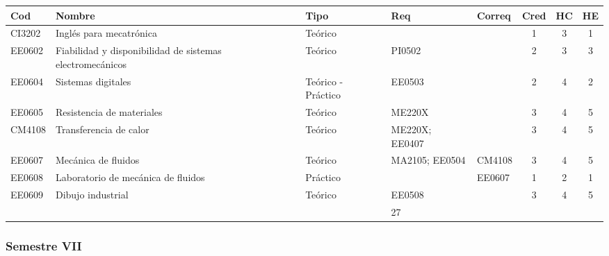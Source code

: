 \begin{center}
\small
\begin{adjustbox}{max width=\textwidth}
\begin{tabular}{|>{\RaggedRight\arraybackslash}p{1.25cm}|>{\RaggedRight\arraybackslash}p{5.2cm}|>{\RaggedRight\arraybackslash}p{1.65cm}|p{1.25cm}|p{1.25cm}|c|c|c|}
\hline
\rowcolor{grisEncabezado}
Cod & Nombre & Tipo & Req & Correq & Cred & HC & HE \\ \hline
CI3202 & Inglés para mecatrónica & Teórico &  &  & 1 & 3 & 1 \\ \hline
\rowcolor{azulTabla}
EE0602 & Fiabilidad y disponibilidad de sistemas electromecánicos & Teórico & PI0502 &  & 2 & 3 & 3 \\ \hline
EE0604 & Sistemas digitales & Teórico - Práctico & EE0503 &  & 2 & 4 & 2 \\ \hline
\rowcolor{azulTabla}
EE0605 & Resistencia de materiales & Teórico & ME220X &  & 3 & 4 & 5 \\ \hline
CM4108 & Transferencia de calor & Teórico & ME220X; EE0407 &  & 3 & 4 & 5 \\ \hline
\rowcolor{azulTabla}
EE0607 & Mecánica de fluidos & Teórico & MA2105; EE0504 & CM4108 & 3 & 4 & 5 \\ \hline
EE0608 & Laboratorio de mecánica de fluidos & Práctico &  & EE0607 & 1 & 2 & 1 \\ \hline
\rowcolor{azulTabla}
EE0609 & Dibujo industrial & Teórico & EE0508 &  & 3 & 4 & 5 \\ \hline
\multicolumn{5}{|l|}{Total} & 18 & 28 & 27 \\ \hline
\end{tabular}
\end{adjustbox}
\end{center}

\subsubsection*{Semestre VII}

